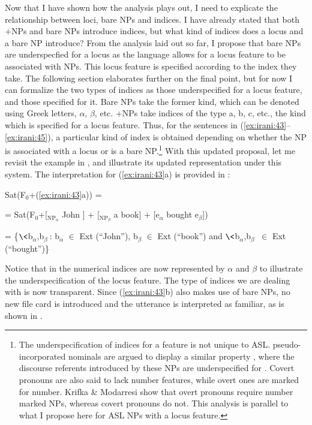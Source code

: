 \documentclass[output=paper,
modfonts
]{langscibook}
\begin{document}
Now that I have shown how the analysis plays out, I need to explicate the relationship between loci, bare NPs and indices. I have already stated that both +NPs and bare NPs introduce indices, but what kind of indices does a locus and a bare NP introduce? From the analysis laid out so far, I propose that bare NPs are underspecfied for a locus as the language allows for a locus feature to be associated with NPs. This locus feature is specified according to the index they take. The following section elaborates further on the final point, but for now I can formalize the two types of indices as those underspecified for a locus feature, and those specified for it. Bare NPs take the former kind, which can be denoted using Greek letters, \(\alpha\), \(\beta\), etc. +NPs take indices of the type a, b, c, etc., the kind which is specified for a locus feature. Thus, for the sentences in (\ref{ex:irani:43}--\ref{ex:irani:45}), a particular kind of index is obtained depending on whether the NP is associated with a locus or is a bare NP.\footnote{The underspecification of indices for a feature is not unique to ASL.  pseudo-incorporated nominals are argued to display a similar property \citep{KrifkaModarresi2016}, where the discourse referents introduced by these NPs are underspecified for . Covert pronouns are also said to lack number features, while overt ones are marked for number. Krifka \& Modarresi show that overt pronouns require number marked NPs, whereas covert pronouns do not. This analysis is parallel to what I propose here for ASL NPs with a locus feature.} With this updated proposal, let me revisit the example in , and illustrate its updated representation under this system. The interpretation for (\ref{ex:irani:43}a) is provided in :  

\ea \label{ex:irani:57} 
Sat(F$_0$+(\ref{ex:irani:43}a)) = \par 
= Sat(F$_0$+[$_{\text{NP}_\alpha}$ John ] + [$_{\text{NP}_\beta}$ a book] + [e$_{\alpha}$ bought e$_{\beta}$]) \par 
= \{$\<$b$_{\alpha}$,b$_{\beta}\>$: b$_{\alpha}$ \(\in\) Ext (``John''), b$_{\beta}$ \(\in\) Ext (``book'') and $\<$b$_{\alpha}$,b$_{\beta}\>$ \(\in\) Ext (``bought'')\} \par 
\z 


Notice that in  the numerical indices are now represented by \(\alpha\) and \(\beta\) to illustrate the underspecification of the locus feature. The type of indices we are dealing with is now transparent. Since (\ref{ex:irani:43}b) also makes use of bare NPs, no new file card is introduced and the utterance is interpreted as familiar, as is shown in . \newpage 
\end{document}
